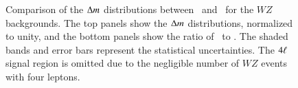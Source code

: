 \begin{itemize}
\begin{figure}[h]
{			
		}
		\caption{Comparison of the $\Delta m$ distributions between \powheg\ and \sherpa\ for the $WZ$ backgrounds. The top panels show the $\Delta m$ distributions, normalized to unity, and the bottom panels show the ratio of \powheg\ to \sherpa. The shaded bands and error bars represent the statistical uncertainties. The $4\ell$ signal region is omitted due to the negligible number of $WZ$ events with four leptons.}
		\label{fig:systematic-WZ-shape}
	\end{figure}

	


\end{itemize}
